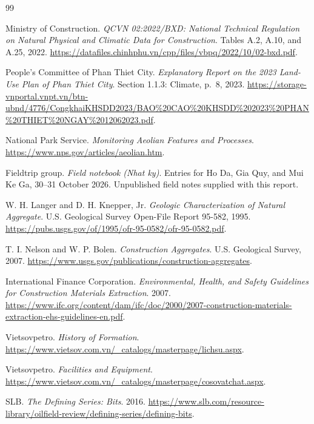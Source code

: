 \documentclass[11pt, a4paper]{article}
\begin{document}
\clearpage
{}
{}
\begin{thebibliography}{99}


 Ministry of Construction. \textit{QCVN 02:2022/BXD: National Technical Regulation on Natural Physical and Climatic Data for Construction}. Tables A.2, A.10, and A.25, 2022. \url{https://datafiles.chinhphu.vn/cpp/files/vbpq/2022/10/02-bxd.pdf}.

 People's Committee of Phan Thiet City. \textit{Explanatory Report on the 2023 Land-Use Plan of Phan Thiet City}. Section 1.1.3: Climate, p.\ 8, 2023. \url{https://storage-vnportal.vnpt.vn/btn-ubnd/4776/CongkhaiKHSDD2023/BAO%20CAO%20KHSDD%202023%20PHAN%20THIET%20NGAY%2012062023.pdf}.

 National Park Service. \textit{Monitoring Aeolian Features and Processes}. \url{https://www.nps.gov/articles/aeolian.htm}.


 Fieldtrip group. \textit{Field notebook (Nhat ky)}. Entries for Ho Da, Gia Quy, and Mui Ke Ga, 30--31 October 2026. Unpublished field notes supplied with this report.

 W. H. Langer and D. H. Knepper, Jr. \textit{Geologic Characterization of Natural Aggregate}. U.S. Geological Survey Open-File Report 95-582, 1995. \url{https://pubs.usgs.gov/of/1995/ofr-95-0582/ofr-95-0582.pdf}.

 T. I. Nelson and W. P. Bolen. \textit{Construction Aggregates}. U.S. Geological Survey, 2007. \url{https://www.usgs.gov/publications/construction-aggregates}.

 International Finance Corporation. \textit{Environmental, Health, and Safety Guidelines for Construction Materials Extraction}. 2007. \url{https://www.ifc.org/content/dam/ifc/doc/2000/2007-construction-materials-extraction-ehs-guidelines-en.pdf}.

 Vietsovpetro. \textit{History of Formation}. \url{https://www.vietsov.com.vn/_catalogs/masterpage/lichsu.aspx}.

 Vietsovpetro. \textit{Facilities and Equipment}. \url{https://www.vietsov.com.vn/_catalogs/masterpage/cosovatchat.aspx}.

 SLB. \textit{The Defining Series: Bits}. 2016. \url{https://www.slb.com/resource-library/oilfield-review/defining-series/defining-bits}.


\end{thebibliography}
\end{document}
